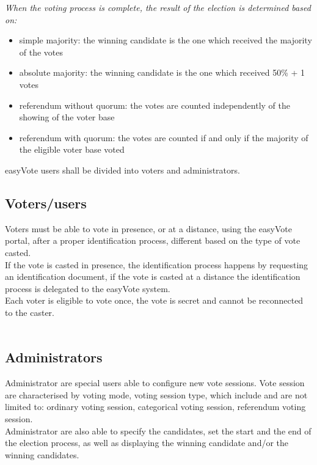 \documentclass[11pt, oneside]{article}   	%
\begin{document}
\emph{When the voting process is complete, the result of the election is determined based on:}
\begin{itemize}
\item simple majority: the winning candidate is the one which received the majority of the votes
\item absolute majority: the winning candidate is the one which received 50\% + 1 votes
\item referendum without quorum: the votes are counted independently of the showing of the voter base
\item referendum with quorum: the votes are counted if and only if the majority of the eligible voter base voted
\end{itemize}
easyVote users shall be divided into voters and administrators. 
\subsection{Voters/users}
Voters must be able to vote in presence, or at a distance, using the easyVote portal, after a proper identification process, different based on the type of vote casted. \\If the vote is casted in presence, the identification process happens by requesting an identification document, if the vote is casted at a distance the identification process is delegated to the easyVote system.\\
Each voter is eligible to vote once, the vote is secret and cannot be reconnected to the caster.\\\\

\subsection{Administrators}

Administrator are special users able to configure new vote sessions. Vote session are characterised by  voting mode, voting session type, which include and are not limited to: ordinary voting session, categorical voting session, referendum voting session. \\

Administrator are also able to specify the candidates, set the start and the end of the election process, as well as displaying the winning candidate and/or the winning candidates.
\clearpage
\end{document}
